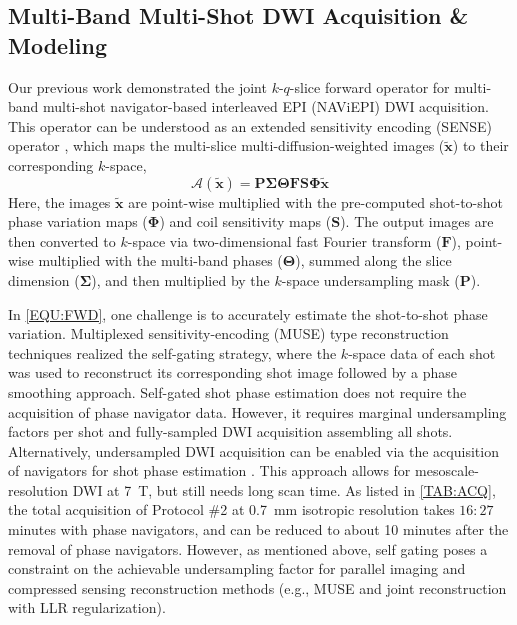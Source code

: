 \documentclass[journal,twoside,web]{ieeecolor}
\begin{document}
	\subsection{Multi-Band Multi-Shot DWI Acquisition \& Modeling} \label{SEC:FWD}

	Our previous work \cite{tan_2024_naviepi} demonstrated
	the joint $k$-$q$-slice forward operator
	for multi-band multi-shot navigator-based interleaved EPI (NAViEPI) DWI acquisition.
	This operator can be understood as
	an extended sensitivity encoding (SENSE) operator \cite{pruessmann_2001_gsense},
	which maps the multi-slice multi-diffusion-weighted images ($\mathbf{\tilde{x}}$)
	to their corresponding $k$-space,
	\begin{equation}
		\mathcal{A}(\mathbf{\tilde{x}}) = \mathbf{P \Sigma \Theta F S \Phi} \mathbf{\tilde{x}}
		\label{EQU:FWD}
	\end{equation}
	Here, the images $\mathbf{\tilde{x}}$ are point-wise multiplied
	with the pre-computed shot-to-shot phase variation maps ($\mathbf{\Phi}$)
	and coil sensitivity maps ($\mathbf{S}$).
	The output images are then converted to $k$-space
	via two-dimensional fast Fourier transform ($\mathbf{F}$),
	point-wise multiplied with the multi-band phases ($\mathbf{\Theta}$),
	summed along the slice dimension ($\mathbf{\Sigma}$),
	and then multiplied by the $k$-space undersampling mask ($\mathbf{P}$).

	In \cref{EQU:FWD}, one challenge is
	to accurately estimate the shot-to-shot phase variation.
	Multiplexed sensitivity-encoding (MUSE) type reconstruction techniques
	\cite{liu_2004_diff_spiral,uecker_2009_nlinv_diff,chen_2013_muse,merrem_2019_nl_steam}
	realized the self-gating strategy,
	where the $k$-space data of each shot was used to reconstruct
	its corresponding shot image followed by a phase smoothing approach.
	Self-gated shot phase estimation does not require
	the acquisition of phase navigator data.
	However, it requires marginal undersampling factors per shot and
	fully-sampled DWI acquisition assembling all shots.
	Alternatively, undersampled DWI acquisition can be enabled
	via the acquisition of navigators for shot phase estimation
	\cite{tan_2024_naviepi}.
	This approach allows for mesoscale-resolution DWI at \SI{7}{\tesla},
	but still needs long scan time.
	As listed in \cref{TAB:ACQ}, the total acquisition of
	Protocol \#2 at \SI{0.7}{mm} isotropic resolution
	takes $16:27$ minutes with phase navigators,
	and can be reduced to about 10 minutes after the removal of phase navigators.
	However, as mentioned above, self gating poses a constraint
	on the achievable undersampling factor
	for parallel imaging and compressed sensing reconstruction methods
	(e.g., MUSE and joint reconstruction with LLR regularization).
\end{document}
